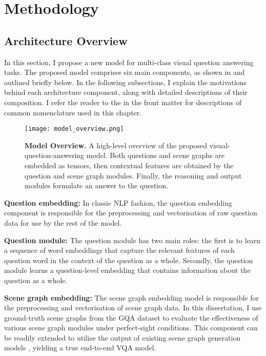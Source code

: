 \chapter{Methodology}
\label{chapter:methodology}

\section{Architecture Overview}
\label{section:architecture_overview}

In this section, I propose a new model for multi-class visual question answering tasks. The proposed model comprises six main components, as shown in \figureautorefname{ \ref{fig:model_overview}} and outlined briefly below. In the following subsections, I explain the motivations behind each architecture component, along with detailed descriptions of their composition. I refer the reader to the  in the front matter for descriptions of common nomenclature used in this chapter.


\begin{figure}[htbp]
    \centering
    \texttt{[image: model\_overview.png]}
    \caption[An overview of the proposed visual-question-answering model.]{\textbf{Model Overview.} A high-level overview of the proposed visual-question-answering model. Both questions and scene graphs are embedded as tensors, then contextual features are obtained by the question and scene graph modules. Finally, the reasoning and output modules formulate an answer to the question.}
    \label{fig:model_overview}
\end{figure}

\textbf{Question embedding:} In classic NLP fashion, the question embedding component is responsible for the preprocessing and vectorisation of raw question data for use by the rest of the model.

\textbf{Question module:} The question module has two main roles: the first is to learn a sequence of word embeddings that capture the relevant features of each question word in the context of the question as a whole. Secondly, the question module learns a question-level embedding that contains information about the question as a whole.

\textbf{Scene graph embedding:} The scene graph embedding model is responsible for the preprocessing and vectorisation of scene graph data. In this dissertation, I use ground-truth scene graphs from the GQA dataset to evaluate the effectiveness of various scene graph modules under perfect-sight conditions. This component can be readily extended to utilise the output of existing scene graph generation models \cite{yang2018graph, li2019relation}, yielding a true end-to-end VQA model.

